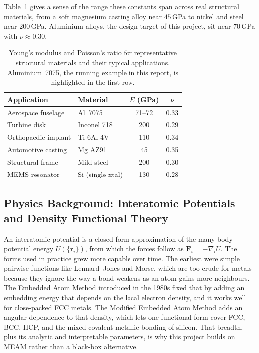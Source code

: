 Table~\ref{tab:applications} gives a sense of the range these constants span
across real structural materials, from a soft magnesium casting alloy near
$45$\,GPa to nickel and steel near $200$\,GPa. Aluminium alloys, the design
target of this project, sit near $70$\,GPa with $\nu\approx0.30$.

\begin{table}[htbp]
	\centering
	\caption{Young's modulus and Poisson's ratio for representative structural
	materials and their typical applications. Aluminium~7075, the running
	example in this report, is highlighted in the first row.}
	\label{tab:applications}
	\renewcommand{\arraystretch}{1.2}
	\begin{tabular}{|l|l|c|c|}
		\hline
		\textbf{Application} & \textbf{Material} & \textbf{$E$ (GPa)} & \textbf{$\nu$} \\ \hline
		Aerospace fuselage   & Al~7075          & 71--72 & 0.33 \\ \hline
		Turbine disk         & Inconel 718      & 200    & 0.29 \\ \hline
		Orthopaedic implant  & Ti-6Al-4V        & 110    & 0.34 \\ \hline
		Automotive casting   & Mg AZ91          & 45     & 0.35 \\ \hline
		Structural frame     & Mild steel       & 200    & 0.30 \\ \hline
		MEMS resonator       & Si (single xtal) & 130    & 0.28 \\ \hline
	\end{tabular}
\end{table}

\subsection{Physics Background: Interatomic Potentials and Density Functional Theory}
An interatomic potential is a closed-form approximation of the many-body
potential energy $U(\{\mathbf{r}_i\})$, from which the forces follow as
$\mathbf{F}_i=-\nabla_i U$. The forms used in practice grew more capable over
time. The earliest were simple pairwise functions like Lennard--Jones and
Morse, which are too crude for metals because they ignore the way a bond
weakens as an atom gains more neighbours. The Embedded Atom Method introduced
in the 1980s fixed that by adding an embedding energy that depends on the local
electron density, and it works well for close-packed FCC metals. The Modified
Embedded Atom Method \citep{baskes1992,lee2001} adds an angular dependence to
that density, which lets one functional form cover FCC, BCC, HCP, and the
mixed covalent-metallic bonding of silicon. That breadth, plus its analytic
and interpretable parameters, is why this project builds on MEAM rather than a
black-box alternative.

